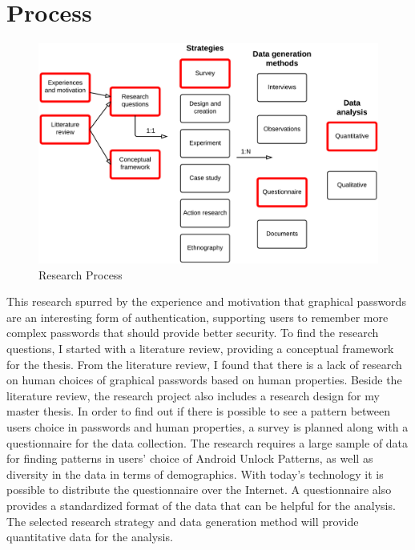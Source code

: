   \section*{Process}

  \begin{figure}
     \vspace{-20pt}
     \begin{center}
        \includegraphics[scale=0.13]{ResearchProcess.png}
     \end{center}
     \vspace{-5pt}
     \caption{Research Process \cite{empiriske}}
   \end{figure}

  This research spurred by the experience and motivation that graphical passwords are an interesting form of authentication, supporting users to remember more complex passwords that should provide better security. To find the research questions, I started with a literature review, providing a conceptual framework for the thesis. From the literature review, I found that there is a lack of research on human choices of graphical passwords based on human properties. Beside the literature review, the research project also includes a research design for my master thesis. In order to find out if there is possible to see a pattern between users choice in passwords and human properties, a survey is planned along with a questionnaire for the data collection. The research requires a large sample of data for finding patterns in users' choice of Android Unlock Patterns, as well as diversity in the data in terms of demographics. With today's technology it is possible to distribute the questionnaire over the Internet. A questionnaire also provides a standardized format of the data that can be helpful for the analysis. The selected research strategy and data generation method will provide quantitative data for the analysis.

